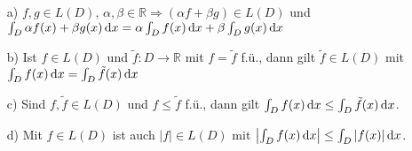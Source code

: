 \begin{proposition}\leavevmode
\label{integ_rechenregeln}
	\begin{itemize}
		\item[a)] $f,g\in L(D),\,\alpha,\beta\in\mathbb{R}\Rightarrow (\alpha f+\beta g)\in L(D)$
		und \\$\int_{D} \alpha f(x)+\beta g(x) \,\text{d}x =\alpha\int_{D} f(x) \,\text{d}x+\beta\int_{D} g(x) \,\text{d}x$
		\item[b)] Ist $f\in L(D)$ und $\tilde{f}\colon D\to\mathbb{R}$ mit $f=\tilde{f}$ f.ü., dann gilt $\tilde{f}\in L(D)$ mit $\int_{D} f(x) \,\text{d}x=\int_{D} \tilde{f}(x) \,\text{d}x$
		\item[c)] Sind $f, \tilde{f}\in L(D)$ und $f\leq \tilde{f}$ f.ü., dann gilt $\int_{D} f(x) \,\text{d}x \leq\int_{D} \tilde{f}(x) \,\text{d}x$.
		\item[d)] Mit $f\in L(D)$ ist auch $|f|\in L(D)$ mit $\left|\int_{D} f(x) \,\text{d}x\right|\leq\int_{D} |f(x)| \,\text{d}x$. 
	\end{itemize}
\end{proposition}
